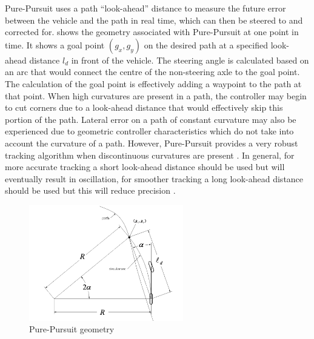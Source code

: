 \documentclass[main.tex]{subfiles}
\begin{document}
Pure-Pursuit uses a path ``look-ahead'' distance to measure the future error between the vehicle and the path in real time, which can then be steered to and corrected for.  shows the geometry associated with Pure-Pursuit at one point in time. It shows a goal point $(g_x, g_y)$ on the desired path at a specified look-ahead distance $l_d$ in front of the vehicle. The steering angle is calculated based on an arc that would connect the centre of the non-steering axle to the goal point. The calculation of the goal point is effectively adding a waypoint to the path at that point. When high curvatures are present in a path, the controller may begin to cut corners due to a look-ahead distance that would effectively skip this portion of the path. Lateral error on a path of constant curvature may also be experienced due to geometric controller characteristics which do not take into account the curvature of a path. However, Pure-Pursuit provides a very robust tracking algorithm when discontinuous curvatures are present \parencite{snider2009}. In general, for more accurate tracking a short look-ahead distance should be used but will eventually result in oscillation, for smoother tracking a long look-ahead distance should be used but this will reduce precision \parencite{snider2009}.
\begin{figure}[ht]
\includegraphics[width=0.6\textwidth]{2-LiteratureReview/purePursuitGoal.png}
\centering
\caption[Pure-Pursuit geometry]{Pure-Pursuit geometry \parencite{snider2009}} 
\end{figure}

%
%
\end{document}
